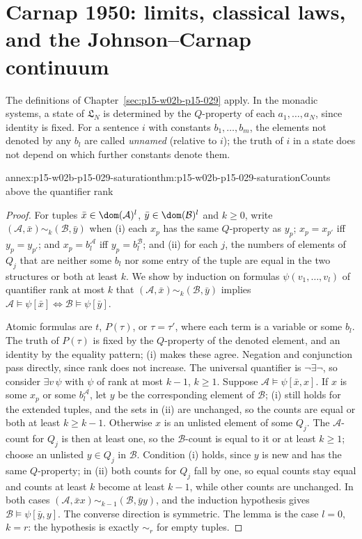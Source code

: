 \section{Carnap 1950: limits, classical laws, and the Johnson--Carnap continuum}
\label{sec:annex-p15-w02b-p15-029}

The definitions of Chapter~\ref{sec:p15-w02b-p15-029} apply. In the
monadic systems, a state of \(\mathfrak L_N\) is determined by the
\(Q\)-property of each \(a_1,\ldots,a_N\), since identity is fixed.
For a sentence \(i\) with constants \(b_1,\ldots,b_m\), the elements
not denoted by any \(b_l\) are called \emph{unnamed} (relative to
\(i\)); the truth of \(i\) in a state does not depend on which
further constants denote them.

\begin{annexitem}{annex:p15-w02b-p15-029-saturation}{thm:p15-w02b-p15-029-saturation}{Counts above the quantifier rank}
\begin{proof}
For tuples \(\bar x\in\dom(\mathcal A)^l\), \(\bar y\in\dom(\mathcal B)^l\)
and \(k\geq0\), write \((\mathcal A,\bar x)\sim_k(\mathcal B,\bar y)\)
when (i) each \(x_p\) has the same \(Q\)-property as \(y_p\);
\(x_p=x_{p'}\) iff \(y_p=y_{p'}\); and \(x_p=b_l^{\mathcal A}\) iff
\(y_p=b_l^{\mathcal B}\); and (ii) for each \(j\), the numbers of
elements of \(Q_j\) that are neither some \(b_l\) nor some entry of
the tuple are equal in the two structures or both at least \(k\).
We show by induction on formulas \(\psi(v_1,\ldots,v_l)\) of quantifier
rank at most \(k\) that \((\mathcal A,\bar x)\sim_k(\mathcal B,\bar y)\)
implies \(\mathcal A\models\psi[\bar x]\iff\mathcal B\models\psi[\bar y]\).

Atomic formulas are \(t\), \(P(\tau)\), or \(\tau=\tau'\), where each
term is a variable or some \(b_l\). The truth of \(P(\tau)\) is fixed
by the \(Q\)-property of the denoted element, and an identity by the
equality pattern; (i) makes these agree. Negation and conjunction pass
directly, since rank does not increase. The universal quantifier is
\(\neg\exists\neg\), so consider \(\exists v\,\psi\) with
\(\psi\) of rank at most \(k-1\), \(k\geq1\). Suppose
\(\mathcal A\models\psi[\bar x,x]\). If \(x\) is some \(x_p\) or
some \(b_l^{\mathcal A}\), let \(y\) be the corresponding element of
\(\mathcal B\); (i) still holds for the extended tuples, and the sets
in (ii) are unchanged, so the counts are equal or both at least
\(k\geq k-1\). Otherwise \(x\) is an unlisted element of some
\(Q_j\). The \(\mathcal A\)-count for \(Q_j\) is then at least one,
so the \(\mathcal B\)-count is equal to it or at least \(k\geq1\);
choose an unlisted \(y\in Q_j\) in \(\mathcal B\). Condition (i)
holds, since \(y\) is new and has the same \(Q\)-property; in (ii)
both counts for \(Q_j\) fall by one, so equal counts stay equal and
counts at least \(k\) become at least \(k-1\), while other counts are
unchanged. In both cases
\((\mathcal A,\bar xx)\sim_{k-1}(\mathcal B,\bar yy)\), and the
induction hypothesis gives \(\mathcal B\models\psi[\bar y,y]\).
The converse direction is symmetric. The lemma is the case \(l=0\),
\(k=r\): the hypothesis is exactly \(\sim_r\) for empty tuples.
\end{proof}
\end{annexitem}

